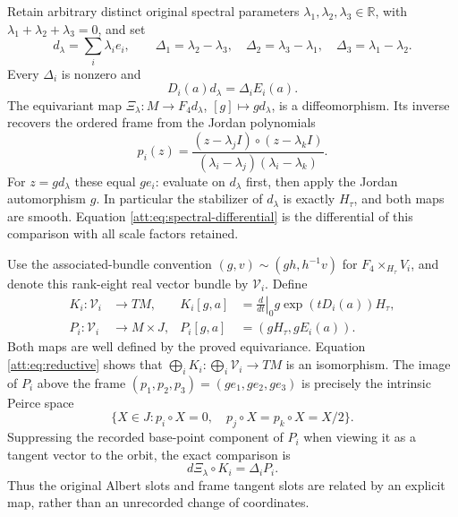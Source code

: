 \documentclass[11pt]{article}
\theoremstyle{definition}
\begin{document}
Retain arbitrary distinct original spectral parameters
$\lambda_1,\lambda_2,\lambda_3\in\mathbb R$, with
$\lambda_1+\lambda_2+\lambda_3=0$, and set
\[
 d_\lambda=\sum_i\lambda_i e_i,\qquad
 \Delta_1=\lambda_2-\lambda_3,\quad
 \Delta_2=\lambda_3-\lambda_1,\quad
 \Delta_3=\lambda_1-\lambda_2.
\]
Every $\Delta_i$ is nonzero and
\begin{equation}
 D_i(a)d_\lambda=\Delta_i E_i(a).
 \label{att:eq:spectral-differential}
\end{equation}
The equivariant map
$\Xi_\lambda:M\to F_4d_\lambda$, $[g]\mapsto gd_\lambda$,
is a diffeomorphism. Its inverse recovers the ordered frame from the
Jordan polynomials
\[
 p_i(z)=\frac{(z-\lambda_jI)\circ(z-\lambda_kI)}
              {(\lambda_i-\lambda_j)(\lambda_i-\lambda_k)}.
\]
For $z=gd_\lambda$ these equal $ge_i$: evaluate on $d_\lambda$ first,
then apply the Jordan automorphism $g$. In particular the stabilizer
of $d_\lambda$ is exactly $H_\tau$, and both maps are smooth.
Equation \eqref{att:eq:spectral-differential} is the differential of
this comparison with all scale factors retained.

Use the associated-bundle convention
$(g,v)\sim(gh,h^{-1}v)$ for $F_4\times_{H_\tau}V_i$, and denote this
rank-eight real vector bundle by $\mathcal V_i$. Define
\begin{align}
 K_i:\mathcal V_i&\longrightarrow TM,&
 K_i[g,a]&=\left.\frac{d}{dt}\right|_0
                   g\exp(tD_i(a))H_\tau,\label{att:eq:Kmap}\\
 P_i:\mathcal V_i&\longrightarrow M\times J,&
 P_i[g,a]&=(gH_\tau,gE_i(a)).\nonumber
\end{align}
Both maps are well defined by the proved equivariance.
Equation \eqref{att:eq:reductive} shows that
$\bigoplus_iK_i:\bigoplus_i\mathcal V_i\to TM$ is an isomorphism.
The image of $P_i$ above the frame $(p_1,p_2,p_3)=(ge_1,ge_2,ge_3)$
is precisely the intrinsic Peirce space
\[
 \{X\in J:p_i\circ X=0,\quad p_j\circ X=p_k\circ X=X/2\}.
\]
Suppressing the recorded base-point component of $P_i$ when viewing
it as a tangent vector to the orbit, the exact comparison is
\begin{equation}
 d\Xi_\lambda\circ K_i=\Delta_iP_i.
 \label{att:eq:bundle-comparison}
\end{equation}
Thus the original Albert slots and frame tangent slots are related
by an explicit map, rather than an unrecorded change of coordinates.
\end{document}
